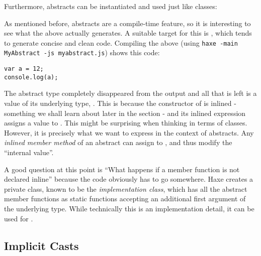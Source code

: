 {Furthermore, abstracts can be instantiated and used just like classes:

As mentioned before, abstracts are a compile-time feature, so it is interesting to see what the above actually generates. A suitable target for this is , which tends to generate concise and clean code. Compiling the above (using \texttt{haxe -main MyAbstract -js myabstract.js}) shows this  code:

\begin{lstlisting}
var a = 12;
console.log(a);
\end{lstlisting}
The abstract type  completely disappeared from the output and all that is left is a value of its underlying type, . This is because the constructor of  is inlined - something we shall learn about later in the section  - and its inlined expression assigns a value to . This might be surprising when thinking in terms of classes. However, it is precisely what we want to express in the context of abstracts. Any \emph{inlined member method} of an abstract can assign to , and thus modify the ``internal value''.


A good question at this point is ``What happens if a member function is not declared inline'' because the code obviously has to go somewhere. Haxe creates a private class, known to be the \emph{implementation class}, which has all the abstract member functions as static functions accepting an additional first argument  of the underlying type. While technically this is an implementation detail, it can be used for .







\subsection{Implicit Casts}
\label{types-abstract-implicit-casts}

}
